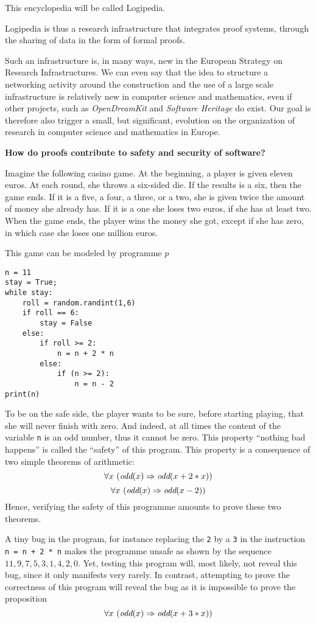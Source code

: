 This encyclopedia will be called Logipedia.

Logipedia is thus a research infrastructure that integrates proof
systems, through the sharing of data in the form of formal proofs.

Such an infrastructure is, in many ways, new in the European Strategy
on Research Infrastructures. We can even say that the idea to
structure a networking activity around the construction and the use of
a large scale infrastructure is relatively new in computer science and
mathematics, even if other projects, such as {\em OpenDreamKit} and
{\em Software Heritage} do exist. Our goal is therefore also trigger a
small, but significant, evolution on the organization of research in
computer science and mathematics in Europe.

\begin{framed}
\begin{center}
{\bf \Large How do proofs contribute to safety and security of software?}
\end{center}

Imagine the following casino game. At the beginning, a player is given
eleven euros. At each round, she throws a six-sided die. If the results is a
six, then the game ends.  If it is a five, a four, a three, or a two,
she is given twice the amount of money she already has. If it is a one
she loses two euros, if she has at least two.  When the game ends,
the player wins the money she got, except if she has zero, in
which case she loses one million euros.

This game can be modeled by programme $p$
\begin{verbatim}
n = 11
stay = True;
while stay:
    roll = random.randint(1,6)
    if roll == 6:
        stay = False
    else:
        if roll >= 2:
            n = n + 2 * n
        else:
            if (n >= 2):
                n = n - 2
print(n)
\end{verbatim}

To be on the safe side, the player wants to be sure, before starting
playing, that she will never finish with zero.  And indeed, at all times
the content of the variable {\tt n} is an odd number,
thus it cannot be zero. This property ``nothing bad happens'' is
called the ``safety'' of this program. This property is a
consequence of two simple theorems of arithmetic:
$$\forall x~(\mbox{\it odd}(x) \Rightarrow \mbox{\it odd}(x + 2 * x))$$
$$\forall x~(\mbox{\it odd}(x) \Rightarrow \mbox{\it odd}(x - 2))$$
Hence, verifying the safety of this programme
amounts to prove these two theorems.

A tiny bug in the program, for instance replacing the {\tt 2} by a
{\tt 3} in the instruction {\tt n = n + 2 * n} makes the programme unsafe
as shown by the sequence $11, 9, 7, 5, 3, 1, 4, 2, 0$. Yet, testing
this program will, most likely, not reveal this bug, since it only manifests
very rarely.  In contrast, attempting to prove the correctness of this
program will
reveal the bug as it is impossible to prove the proposition
$$\forall x~(\mbox{\it odd}(x) \Rightarrow \mbox{\it odd}(x + 3 * x))$$
\end{framed}
